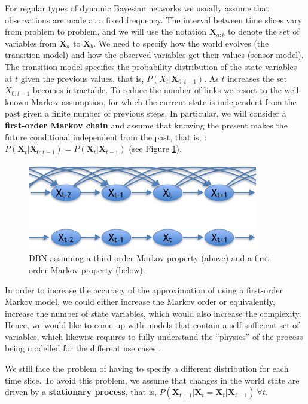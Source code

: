 For regular types of dynamic Bayesian networks we usually assume that observations are made at a fixed frequency. The interval between time slices vary from problem to problem, and we will use the notation $\bm X_{a:b}$ to denote the set of variables from $\bm X_a$ to $\bm X_b$. We need to specify how the world evolves (the transition model) and how the observed variables get their values (sensor model). The transition model specifies the probability distribution of the state variables at $t$ given the previous values, that is, $P(X_t|\bm X_{0:t-1})$. As $t$ increases the set $X_{0:t-1}$ becomes intractable. To reduce the number of links we resort to the well-known Markov assumption, for which the current state is independent from the past given a finite number of previous steps. In particular, we will consider a \textbf{first-order Markov chain} and assume that knowing the present makes the future conditional independent from the past, that is, : $P(\bm X_t|\bm X_{0:t-1}) = P(\bm X_t|\bm X_{t-1})$ (see Figure \ref{Figure:markovChain}).

\begin{figure}
\begin{center}
\includegraphics[scale=0.56]{./figures/PreliminariesMarkovChain}
\caption{\label{Figure:markovChain}DBN assuming a third-order Markov property (above) and a first-order Markov property (below).
}
\end{center}
\end{figure}

In order to increase the accuracy of the approximation of using a first-order Markov model, we could either increase the Markov order or equivalently, increase the number of state variables, which would also increase the complexity. Hence, we would like to come up with models that contain a self-sufficient set of variables, which likewise requires to fully understand the ``physics''  of the process being modelled for the different use cases \cite{russelNorvig2009}. 


We still face the problem of having to specify a different distribution for each time slice. To avoid this problem, we assume that changes in the world state are driven by a \textbf{stationary process}, that is, $P(\bm X_{t+1}|\bm X_{t} =\bm X_t|\bm X_{t-1})\ \forall t$.



